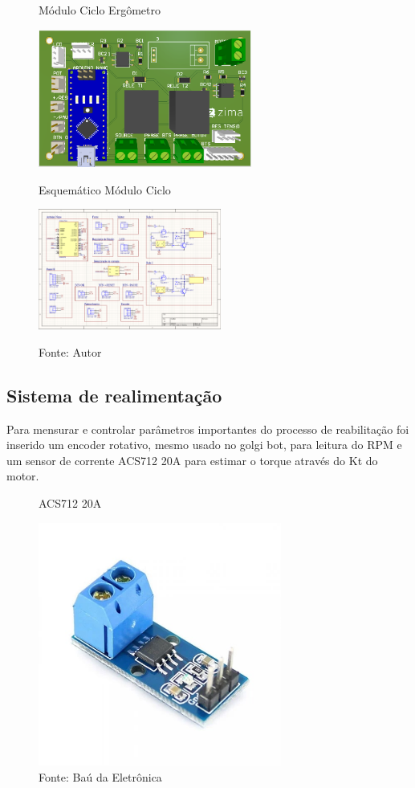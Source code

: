 \documentclass[../poliXuniversity_hospital_(USP)_report.tex]{subfiles}
\begin{document}
\begin{figure}[h]
\centering
    \begin{minipage}{0.5\textwidth}
        \centering
        
        \caption{Módulo Ciclo Ergômetro}
        \centering %
        \includegraphics[width=7cm]{images/pcb_ciclo.png}
        \label{figura: Módulo Ciclo Ergômetro}
        
    \end{minipage}\hfill
    \begin{minipage}{0.5\textwidth}
    
        \centering
        \caption{Esquemático Módulo Ciclo}
        \centering %
        \includegraphics[width=6cm]{images/esquematico_ciclo.png}
        \label{figura: Esquemático Módulo Ciclo}
        
    \end{minipage}\hfill
    \caption*{Fonte: Autor}
\end{figure}

\subsection{Sistema de realimentação}

Para mensurar e controlar parâmetros importantes do processo de reabilitação foi inserido um encoder rotativo, mesmo usado no golgi bot, para leitura do RPM e um sensor de corrente ACS712 20A para estimar o torque através do Kt do motor.

\begin{figure}[h]
\centering
    \caption{ACS712 20A}
    \centering %
    \includegraphics[width=8cm]{images/acs712.jpg}
    \caption*{Fonte: Baú da Eletrônica}
    \label{figura: ACS712 20A4}
\end{figure}
\end{document}
